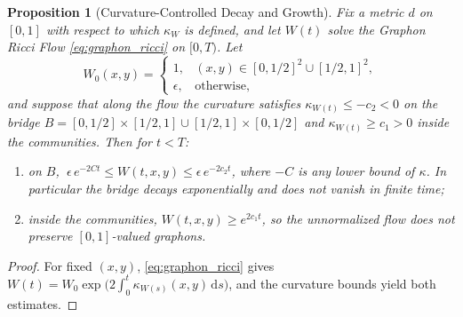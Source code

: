 \documentclass[11pt,a4paper,reqno]{amsart}
\newtheorem{proposition}[theorem]{Proposition}
\theoremstyle{definition}
\numberwithin{equation}{section}
\newcommand{\dif}{\,\mathrm{d}}
\begin{document}
\begin{proposition}[Curvature-Controlled Decay and Growth]
\label{thm:ricci_neckpinch}
Fix a metric $d$ on $[0,1]$ with respect to which $\kappa_W$ is defined, and let $W(t)$ solve the Graphon Ricci Flow \eqref{eq:graphon_ricci} on $[0,T)$. Let
\begin{equation}
    W_0(x, y) = \begin{cases} 1, & (x, y) \in [0, 1/2]^2 \cup [1/2, 1]^2, \\ \epsilon, & \text{otherwise}, \end{cases}
\end{equation}
and suppose that along the flow the curvature satisfies $\kappa_{W(t)} \le -c_2 < 0$ on the bridge $B = [0,1/2]\times[1/2,1] \cup [1/2,1]\times[0,1/2]$ and $\kappa_{W(t)} \ge c_1 > 0$ inside the communities. Then for $t < T$:
\begin{enumerate}[label=(\roman*)]
    \item on $B$, $\ \epsilon\, e^{-2Ct} \le W(t, x, y) \le \epsilon\, e^{-2 c_2 t}$, where $-C$ is any lower bound of $\kappa$. In particular the bridge decays exponentially and does not vanish in finite time;
    \item inside the communities, $W(t,x,y) \ge e^{2 c_1 t}$, so the unnormalized flow does not preserve $[0,1]$-valued graphons.
\end{enumerate}
\end{proposition}
\begin{proof}
For fixed $(x,y)$, \eqref{eq:graphon_ricci} gives $W(t) = W_0 \exp\big(2\int_0^t \kappa_{W(s)}(x,y)\dif s\big)$, and the curvature bounds yield both estimates.
\end{proof}
\end{document}
